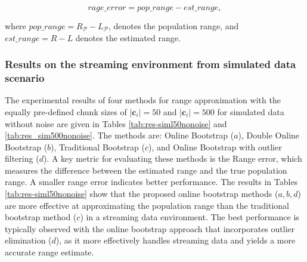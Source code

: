 \documentclass[a4paper,fleqn]{cas-dc}
\begin{document}
$$rage\_error = pop\_range-est\_range,$$

where $pop\_range = R_{\mathcal{P}}-L_{\mathcal{P}}$, denotes the population range, and $est\_range = R-L$ denotes the estimated range.

\subsubsection{Results on the streaming environment from simulated data scenario}

The experimental results of four methods for range approximation with the equally pre-defined chunk sizes of $|\mathbf{c}_i|=50$ and 
$|\mathbf{c}_i|=500$ for simulated data without noise are given in Tables \ref{tab:res-siml50nonoise} and 
\ref{tab:res_sim500nonoise}. The methods are: Online Bootstrap ($a$), Double Online Bootstrap ($b$), 
Traditional Bootstrap ($c$), and Online Bootstrap with outlier filtering ($d$). A key metric for 
evaluating these methods is the Range error, which measures the difference between the estimated 
range and the true population range. A smaller range error indicates better performance. The results in Tables \ref{tab:res-siml50nonoise} 
show that the proposed online bootstrap methods ($a, b, d$) are more effective at approximating 
the population range than the traditional bootstrap method ($c$) in a streaming data environment. 
The best performance is typically observed with the online bootstrap approach that incorporates outlier elimination ($d$), as it %
more effectively handles streaming data and yields a more accurate range 
estimate. 
\end{document}
